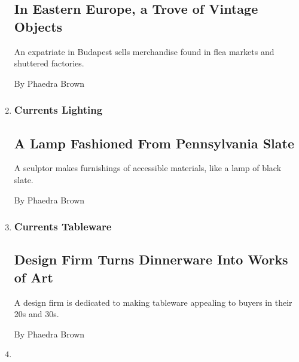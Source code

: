 \begin{enumerate}
  \hypertarget{in-eastern-europe-a-trove-of-vintage-objects}{%
  \subsection{In Eastern Europe, a Trove of Vintage
  Objects}\label{in-eastern-europe-a-trove-of-vintage-objects}}

  An expatriate in Budapest sells merchandise found in flea markets and
  shuttered factories.

  By Phaedra Brown
\item
  \href{/2010/09/16/garden/16lighting.html}{}

  \hypertarget{currents--lighting}{%
  \subsubsection{Currents \textbar{}
  Lighting}\label{currents--lighting}}

  \hypertarget{a-lamp-fashioned-from-pennsylvania-slate}{%
  \subsection{A Lamp Fashioned From Pennsylvania
  Slate}\label{a-lamp-fashioned-from-pennsylvania-slate}}

  A sculptor makes furnishings of accessible materials, like a lamp of
  black slate.

  By Phaedra Brown
\item
  \href{/2010/09/09/garden/09tableware.html}{}

  \hypertarget{currents--tableware}{%
  \subsubsection{Currents \textbar{}
  Tableware}\label{currents--tableware}}

  \hypertarget{design-firm-turns-dinnerware-into-works-of-art}{%
  \subsection{Design Firm Turns Dinnerware Into Works of
  Art}\label{design-firm-turns-dinnerware-into-works-of-art}}

  A design firm is dedicated to making tableware appealing to buyers in
  their 20s and 30s.

  By Phaedra Brown
\item
  \href{/2010/09/02/garden/02online.html}{}


\end{enumerate}

